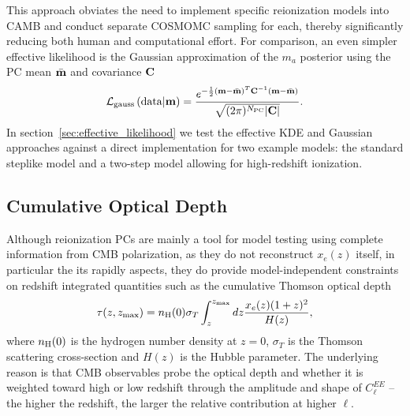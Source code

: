 \documentclass[prd,twocolumn,amsmath,amssymb,floatfix,superscriptaddress,nofootinbib]{revtex4-1}
\begin{document}
This approach obviates the need to implement specific reionization models into CAMB and conduct separate COSMOMC sampling for each, thereby significantly reducing both human and computational effort.
For comparison, an even simpler effective likelihood is the Gaussian approximation of the $m_a$ posterior using the PC mean $\bar{\bf m}$ and covariance $\bf C$
%
\begin{equation}
 {\cal L}_{\rm gauss}\left({\rm data}|\mathbf{m} \right) = \frac{ e^{-\frac{1}{2} ({\bf m}-\bar{\bf m})^T {\bf C}^{-1} ({\bf m}-\bar{\bf m}) } }{\sqrt{(2\pi)^{N_{\rm PC}} | \mathbf{C}| }}.
 \label{eq:gaussian}
 \end{equation}
%
In section~\ref{sec:effective_likelihood} we test the effective KDE and Gaussian approaches against a direct implementation
for two example models: the standard steplike model and a two-step model allowing for high-redshift ionization.


%
%
%
 
\subsection{Cumulative Optical Depth}
\label{sec:cumulative}

Although reionization PCs are mainly a tool for model testing using complete information from CMB polarization, as they do not reconstruct $x_e(z)$ itself, in particular the its rapidly  aspects, they do provide model-independent constraints on redshift integrated quantities such as  the cumulative Thomson optical depth
\begin{equation}
\tau(z,z_{\rm max}) = n_{\rm H}(0) \sigma_T \int_z^{z_{\rm max}} dz \frac{x_e(z) (1+z)^{2} }{H(z)},
\label{eq:cumtau}
\end{equation}
where $n_{\rm H}(0)$ is the hydrogen number density at $z=0$, $\sigma_T$ is the Thomson scattering cross-section and $H(z)$ is the Hubble parameter.  The underlying reason is that CMB observables probe the optical depth and whether it is weighted toward high or low redshift through the amplitude and shape of 
$C_\ell^{EE}$ -- the higher the redshift, the
larger the relative contribution at higher $\ell$.
\end{document}
